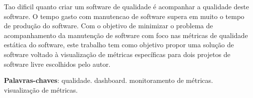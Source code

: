 \begin{resumo}
Tao dificil quanto criar um software de qualidade é acompanhar a qualidade deste software. O tempo gasto com manutencao de software supera em muito o tempo de produção do software. Com o objetivo de minimizar o problema de acompanhamento da manutenção de software com foco nas métricas de qualidade estática do software, este trabalho tem como objetivo propor uma solução de software voltado à visualização de métricas específicas para dois projetos de software livre escolhidos pelo autor. 

 \vspace{\onelineskip}
 
    
 \noindent
 \textbf{Palavras-chaves}: qualidade. dashboard. monitoramento de métricas. visualização de métricas.
\end{resumo}
